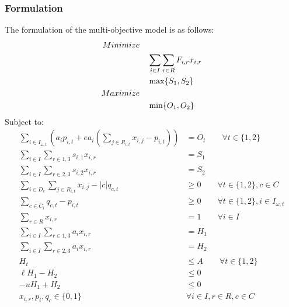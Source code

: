 \subsubsection{Formulation}
The formulation of the multi-objective model is as follows:
\begin{align}
Minimize \quad & \notag\\
&\sum_{i\in I}\sum_{r\in R} F_{i,r} x_{i,r} \label{eqn:objFire} \\
&\max \{S_1,S_2\} \label{eqn:objSediment} \\
Maximize \quad & \notag\\
&\min \{O_1,O_2\} \label{eqn:objOwl}
\end{align}
Subject to:
\begin{align}
\sum_{i\in I_{\omega,t}} \left(a_i p_{i,t} + e a_i \left( \sum_{j \in R_{i,t}} x_{i,j}-p_{i,t} \right) \right) &= O_t \qquad \forall t \in \{1,2\} \label{eqn:constraintDefOwl}\\
\sum_{i\in I} \sum_{r\in 1,3} s_{i,1} x_{i,r} &= S_1 \label{eqn:constraintSediment1} \\
\sum_{i\in I} \sum_{r\in 2,3} s_{i,2} x_{i,r} &= S_2 \label{eqn:constraintSediment2} \\
\sum_{i \in D_c} \sum_{j \in R_{i,t}} x_{i,j} - |c| q_{c,t} &\ge 0 \qquad \forall t \in \{1,2\}, c \in C \label{eqn:constraintClusterTriggers} \\
\sum_{c \in C_i} q_{c,t} - p_{i,t} &\ge 0 \qquad \forall t \in \{1,2\}, i \in I_{\omega,t} \label{eqn:constraintPVarTriggers} \\
\sum_{r \in R} x_{i,r} &= 1  \qquad \forall i \in I \label{eqn:constraintOnePrescrip} \\
\sum_{i \in I} \sum_{r \in 1,3} a_i x_{i,r} &= H_1 \label{eqn:constraintAreaAcctg1} \\
\sum_{i \in I} \sum_{r \in 2,3} a_i x_{i,r} &= H_2 \label{eqn:constraintAreaAcctg2} \\
H_t &\le A \qquad \forall t \in \{1,2\} \label{eqn:constraintAreaRestr} \\
\ell H_1 - H_2 &\le 0 \label{eqn:constraintAreaFlucL} \\
-u H_1 + H_2 &\le 0 \label{eqn:constraintAreaFlucU} \\
x_{i,r}, p_i, q_c \in \{0,1\} \quad &\forall i \in I, r \in R, c \in C \label{eqn:constraintNonNeg}
\end{align}

